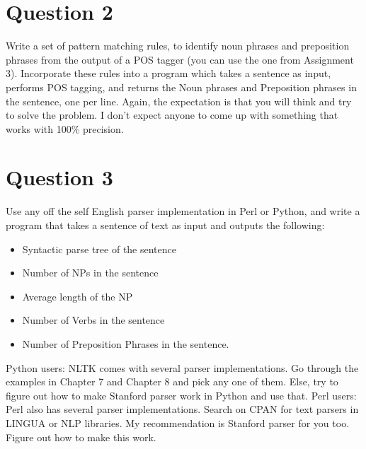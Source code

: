 \documentclass[11pt,a4paper]{article}
\begin{document}
\section*{Question 2}
Write a set of pattern matching rules, to identify noun phrases and preposition phrases from the output of a POS tagger (you can use the one from Assignment 3). Incorporate these rules into a program which takes a sentence as input, performs POS tagging, and returns the Noun phrases and Preposition phrases in the sentence, one per line. Again, the expectation is that you will think and try to solve the problem. I don't expect anyone to come up with something that works with 100\% precision.

\section*{Question 3}
Use any off the self English parser implementation in Perl or Python, and write a program that takes a sentence of text as input and outputs the following: 
\begin{itemize}
\item Syntactic parse tree of the sentence
\item Number of NPs in the sentence
\item Average length of the NP
\item Number of Verbs in the sentence
\item Number of Preposition Phrases in the sentence.
\end{itemize} 
Python users: NLTK comes with several parser implementations. Go through the examples in Chapter 7 and Chapter 8 and pick any one of them. Else, try to figure out how to make Stanford parser work in Python and use that. Perl users: Perl also has several parser implementations. Search on CPAN for text parsers in LINGUA or NLP libraries. My recommendation is Stanford parser for you too. Figure out how to make this work. 
\end{document}
